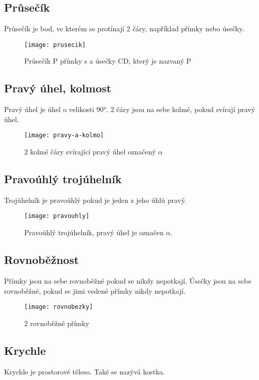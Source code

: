 \subsection{Průsečík}
Průsečík je bod, ve kterém se protínají 2 čáry, například přímky nebo úsečky.

\begin{figure}[h]
    \caption{Průsečík P přímky s a úsečky CD, který je nazvaný P}
    \centering
    \texttt{[image: prusecik]}
\end{figure}

\subsection{Pravý úhel, kolmost}
Pravý úhel je úhel o velikosti 90°. 2 čáry jsou na sebe kolmé, pokud svírají pravý úhel.

\begin{figure}[h]
    \caption{2 kolmé čáry svírající pravý úhel označený $\alpha$}
    \centering
    \texttt{[image: pravy-a-kolmo]}
\end{figure}

\subsection{Pravoúhlý trojúhelník}
Trojúhelník je pravoúhlý pokud je jeden z jeho úhlů pravý.

\begin{figure}[h]
    \caption{Pravoúhlý trojúhelník, pravý úhel je označen $\alpha$.}
    \centering
    \texttt{[image: pravouhly]}
\end{figure}

\subsection{Rovnoběžnost}
Přímky jsou na sebe rovnoběžné pokud se nikdy nepotkají. Úsečky jsou na sebe rovnoběžné, pokud se jimi vedené přímky nikdy nepotkají.

\begin{figure}[h]
    \caption{2 rovnoběžné přímky}
    \centering
    \texttt{[image: rovnobezky]}
\end{figure}

\subsection{Krychle}
Krychle je prostorové těleso. Také se nazývá kostka.

